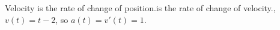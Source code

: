 \documentclass[preview]{standalone}
\begin{document}
\begin{center}
Velocity is the rate of change of position.\Acceleration is the rate of change of velocity.\Here, $v(t) = t - 2$, so $a(t) = v'(t) = 1$.
\end{center}
\end{document}
